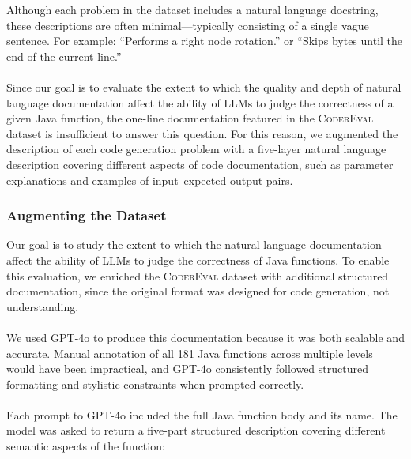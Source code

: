 \documentclass[a4paper]{usiinfbachelorproject}
\begin{document}
Although each problem in the dataset includes a natural language docstring, these descriptions are often minimal—typically consisting of a single vague sentence. For example: “Performs a right node rotation.” or “Skips bytes until the end of the current line.”\\
\\[2pt]
Since our goal is to evaluate the extent to which the quality and depth of natural language documentation affect the ability of LLMs to judge the correctness of a given Java function, the one-line documentation featured in the \textsc{CoderEval} dataset is insufficient to answer this question. For this reason, we augmented the description of each code generation problem with a five-layer natural language description covering different aspects of code documentation, such as parameter explanations and examples of input–expected output pairs.

\subsubsection{Augmenting the Dataset}\label{sec:augmentation}
Our goal is to study the extent to which the natural language documentation affect the ability of LLMs to judge the correctness of Java functions. To enable this evaluation, we enriched the \textsc{CoderEval} dataset with additional structured documentation, since the original format was designed for code generation, not understanding.\\
\\[2pt]
We used GPT-4o to produce this documentation because it was both scalable and accurate. Manual annotation of all 181 Java functions across multiple levels would have been impractical, and GPT-4o consistently followed structured formatting and stylistic constraints when prompted correctly.\\
\\[2pt]
Each prompt to GPT-4o included the full Java function body and its name. The model was asked to return a five-part structured description covering different semantic aspects of the function:
\end{document}
